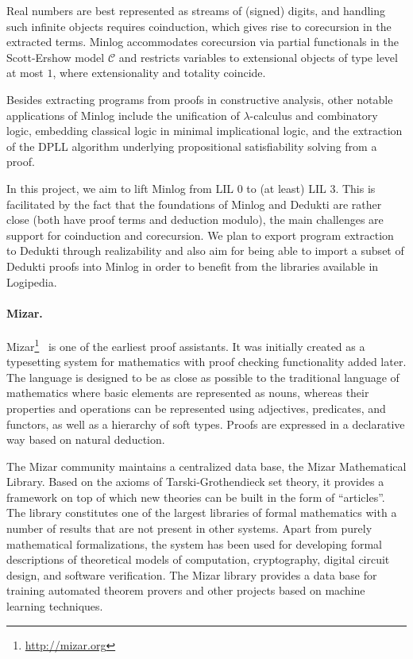 Real numbers are best represented as streams of (signed) digits, and handling
such infinite objects requires coinduction, which gives rise to corecursion in
the extracted terms. Minlog accommodates corecursion via partial functionals in
the Scott-Ershow model $\mathcal{C}$ and restricts variables to extensional
objects of type level at most $1$, where extensionality and totality coincide.

Besides extracting programs from proofs in constructive analysis, other notable
applications of Minlog include the unification of $\lambda$-calculus and
combinatory logic, embedding classical logic in minimal implicational logic, and
the extraction of the DPLL algorithm underlying propositional satisfiability
solving from a proof.

In this project, we aim to lift Minlog from LIL $0$ to (at least) LIL $3$.
This is facilitated by the fact that the foundations of Minlog and Dedukti are
rather close (both have proof terms and deduction modulo), the main challenges
are support for coinduction and corecursion. We plan to export program
extraction to Dedukti through realizability and also aim for being able to
import a subset of Dedukti proofs into Minlog in order to benefit from the
libraries available in Logipedia.

\paragraph*{Mizar.}

Mizar\footnote{\url{http://mizar.org}}~\cite{banczerek:mizar} is one of the
earliest proof assistants. It was initially created as a typesetting system for
mathematics with proof checking functionality added later. The language is
designed to be as close as possible to the traditional language of mathematics
where basic elements are represented as nouns, whereas their properties and
operations can be represented using adjectives, predicates, and functors, as
well as a hierarchy of soft types. Proofs are expressed in a declarative way
based on natural deduction.

The Mizar community maintains a centralized data base, the Mizar Mathematical
Library. Based on the axioms of Tarski-Grothendieck set theory, it provides a
framework on top of which new theories can be built in the form of ``articles''.
The library constitutes one of the largest libraries of formal mathematics with
a number of results that are not present in other systems. Apart from purely
mathematical formalizations, the system has been used for developing formal
descriptions of theoretical models of computation, cryptography, digital circuit
design, and software verification. The Mizar library provides a data base for
training automated theorem provers and other projects based on machine learning
techniques.

